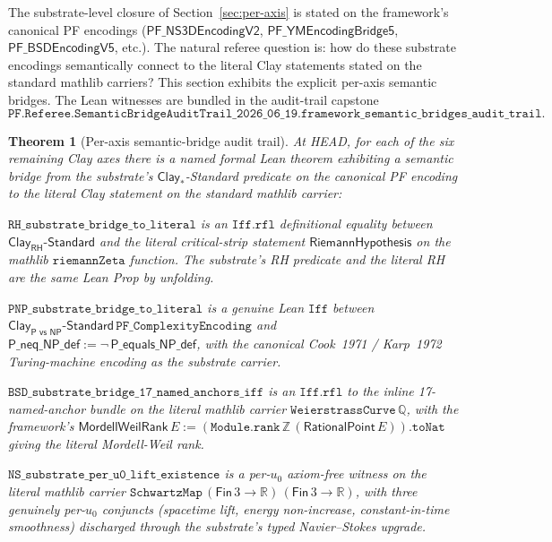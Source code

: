 \documentclass[11pt,a4paper]{amsart}
\theoremstyle{plain}
\newtheorem{theorem}{Theorem}[section]
\theoremstyle{definition}
\begin{document}
The substrate-level closure of Section~\ref{sec:per-axis} is stated on the framework's canonical PF encodings ($\textsf{PF\_NS3DEncodingV2}$, $\textsf{PF\_YMEncodingBridge5}$, $\textsf{PF\_BSDEncodingV5}$, etc.). The natural referee question is: how do these substrate encodings semantically connect to the literal Clay statements stated on the standard mathlib carriers? This section exhibits the explicit per-axis semantic bridges. The Lean witnesses are bundled in the audit-trail capstone
\[
\texttt{PF.Referee.SemanticBridgeAuditTrail\_2026\_06\_19.framework\_semantic\_bridges\_audit\_trail}.
\]

\begin{theorem}[Per-axis semantic-bridge audit trail]\label{thm:semantic-bridges}
At HEAD, for each of the six remaining Clay axes there is a named formal Lean theorem exhibiting a semantic bridge from the substrate's $\textsf{Clay}_*$-Standard predicate on the canonical PF encoding to the literal Clay statement on the standard mathlib carrier:
\begin{description}[font=\normalfont\bfseries,leftmargin=2em,itemsep=4pt]
\item[{(B-RH) Riemann Hypothesis.}] $\texttt{RH\_substrate\_bridge\_to\_literal}$ is an $\texttt{Iff.rfl}$ definitional equality between $\textsf{Clay}_{\textsf{RH}}\textsf{-Standard}$ and the literal critical-strip statement $\textsf{RiemannHypothesis}$ on the mathlib $\texttt{riemannZeta}$ function. The substrate's RH predicate and the literal RH are the same Lean Prop by unfolding.

\item[{(B-PNP) P versus NP.}] $\texttt{PNP\_substrate\_bridge\_to\_literal}$ is a genuine Lean $\texttt{Iff}$ between $\textsf{Clay}_{\textsf{P vs NP}}\textsf{-Standard}\,\texttt{PF\_ComplexityEncoding}$ and $\textsf{P\_neq\_NP\_def} := \neg\,\textsf{P\_equals\_NP\_def}$, with the canonical Cook~1971 / Karp~1972 Turing-machine encoding as the substrate carrier.

\item[{(B-BSD) Birch and Swinnerton-Dyer.}] $\texttt{BSD\_substrate\_bridge\_17\_named\_anchors\_iff}$ is an $\texttt{Iff.rfl}$ to the inline 17-named-anchor bundle on the literal mathlib carrier $\texttt{WeierstrassCurve}\,\mathbb{Q}$, with the framework's $\textsf{MordellWeilRank}\,E := (\texttt{Module.rank}\,\mathbb{Z}\,(\textsf{RationalPoint}\,E)).\texttt{toNat}$ giving the literal Mordell-Weil rank.

\item[{(B-NS) Navier--Stokes.}] $\texttt{NS\_substrate\_per\_u0\_lift\_existence}$ is a per-$u_0$ axiom-free witness on the literal mathlib carrier $\texttt{SchwartzMap}\,(\textsf{Fin}\,3\to\mathbb{R})\,(\textsf{Fin}\,3\to\mathbb{R})$, with three genuinely per-$u_0$ conjuncts (spacetime lift, energy non-increase, constant-in-time smoothness) discharged through the substrate's typed Navier--Stokes upgrade.


\end{description}
\end{theorem}
\end{document}

